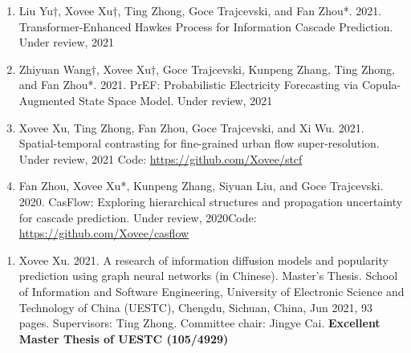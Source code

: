 
\begin{enumerate}[resume]
    \item Liu Yu$\dagger$, Xovee Xu$\dagger$, Ting Zhong, Goce Trajcevski, and Fan Zhou*. 2021. Transformer-Enhanced Hawkes Process for Information Cascade Prediction. Under review, 2021
    \item Zhiyuan Wang$\dagger$, Xovee Xu$\dagger$, Goce Trajcevski, Kunpeng Zhang, Ting Zhong, and Fan Zhou*. 2021. PrEF: Probabilistic Electricity Forecasting via Copula-Augmented State Space Model. Under review, 2021 
    \item Xovee Xu, Ting Zhong, Fan Zhou, Goce Trajcevski, and Xi Wu. 2021. Spatial-temporal contrasting for fine-grained urban flow super-resolution. Under review, 2021 \newline Code: {\color{gray}\url{https://github.com/Xovee/stcf}}
    \item Fan Zhou, Xovee Xu*, Kunpeng Zhang, Siyuan Liu, and Goce Trajcevski. 2020. CasFlow: Exploring hierarchical structures and propagation uncertainty for cascade prediction. Under review, 2020\newline Code: {\color{gray}\url{https://github.com/Xovee/casflow}}
\end{enumerate}


\begin{enumerate}
    \item Xovee Xu. 2021. A research of information diffusion models and popularity prediction using graph neural networks (in Chinese). Master's Thesis. School of Information and Software Engineering, University of Electronic Science and Technology of China (UESTC), Chengdu, Sichuan, China, Jun 2021, 93 pages. Supervisors: Ting Zhong. Committee chair: Jingye Cai. \newline
    \textbf{\color{red}Excellent Master Thesis of UESTC (105/4929)}
\end{enumerate}